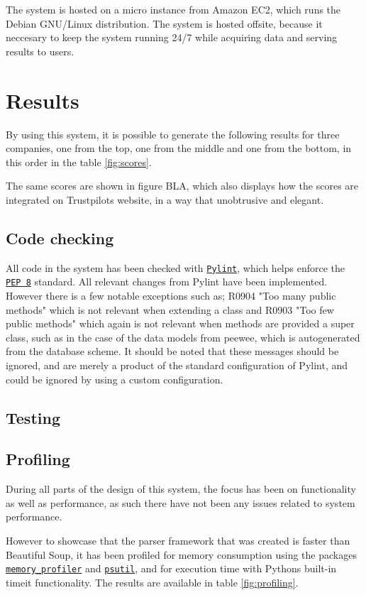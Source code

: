 \documentclass[10pt]{IEEEtran}
\begin{document}
The system is hosted on a micro instance from Amazon EC2, which runs the Debian GNU/Linux distribution. The system is hosted offsite, because it neccesary to keep the system running 24/7 while acquiring data and serving results to users.

\section{Results}
By using this system, it is possible to generate the following results for three companies, one from the top, one from the middle and one from the bottom, in this order in the table \ref{fig:scores}.

The same scores are shown in figure BLA, which also displays how the scores are integrated on Trustpilots website, in a way that unobtrusive and elegant.

\subsection{Code checking}
All code in the system has been checked with \href{http://www.pylint.org/}{\texttt{Pylint}}, which helps enforce the \href{http://www.python.org/dev/peps/pep-0008/}{\texttt{PEP 8}} standard. All relevant changes from Pylint have been implemented. However there is a few notable exceptions such as; R0904 "Too many public methods" which is not relevant when extending a class and R0903 "Too few public methods" which again is not relevant when methods are provided a super class, such as in the case of the data models from peewee, which is autogenerated from the database scheme. It should be noted that these messages should be ignored, and are merely a product of the standard configuration of Pylint, and could be ignored by using a custom configuration.

\subsection{Testing}


\subsection{Profiling}
During all parts of the design of this system, the focus has been on functionality as well as performance, as such there have not been any issues related to system performance.

However to showcase that the parser framework that was created is faster than Beautiful Soup, it has been profiled for memory consumption using the packages \href{https://pypi.python.org/pypi/memory_profiler}{\texttt{memory_profiler}} and \href{http://code.google.com/p/psutil/}{\texttt{psutil}}, and for execution time with Pythons built-in timeit functionality. The results are available in table \ref{fig:profiling}.
\end{document}
